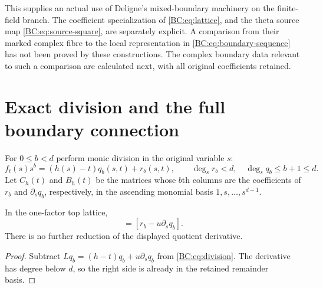 This supplies an actual use of Deligne's mixed-boundary machinery on
the finite-field branch.  The coefficient specialization of
\eqref{BC:eq:lattice}, and the theta source map
\eqref{BC:eq:source-square}, are separately explicit.  A comparison from
their marked complex fibre to the local representation in
\eqref{BC:eq:boundary-sequence} has not been proved by these constructions.
The complex boundary data relevant to such a comparison are calculated
next, with all original coefficients retained.

\section{Exact division and the full boundary connection}

For $0\le b<d$ perform monic division in the original variable $s$:
\begin{equation}
 f_t(s)s^b=(h(s)-t)q_b(s,t)+r_b(s,t),\qquad
 \deg_s r_b<d,\quad \deg_s q_b\le b+1\le d.
 \label{BC:eq:division}
\end{equation}
Let $C_h(t)$ and $B_h(t)$ be the matrices whose $b$th columns are the
coefficients of $r_b$ and $\partial_s q_b$, respectively, in the
ascending monomial basis $1,s,\ldots,s^{d-1}$.

\begin{lemma}
In the one-factor top lattice,
\begin{equation}
 [f_t s^b]=[r_b-u\partial_s q_b].
 \label{BC:eq:reduction}
\end{equation}
There is no further reduction of the displayed quotient derivative.
\end{lemma}
\begin{proof}
Subtract $Lq_b=(h-t)q_b+u\partial_s q_b$ from
\eqref{BC:eq:division}.  The derivative has degree below $d$, so the
right side is already in the retained remainder basis.
\end{proof}

